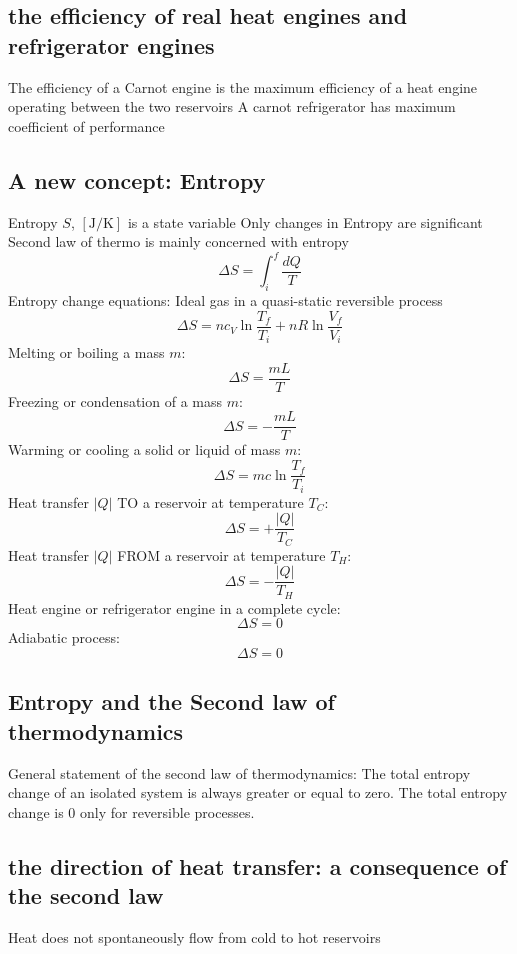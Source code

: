 \documentclass[twocolumn]{article}
\begin{document}
\subsection{the efficiency of real heat engines and refrigerator engines}
\begin{outline}
\1 The efficiency of a Carnot engine is the maximum efficiency of a heat engine operating between the two reservoirs
\1 A carnot refrigerator has maximum coefficient of performance
\end{outline}
\subsection{A new concept: Entropy}
\begin{outline}
\1 Entropy $S$, $[\text{J/K}]$ is a state variable
\1 Only changes in Entropy are significant
\1 Second law of thermo is mainly concerned with entropy
\0 \[\Delta S=\int_{i}^{f}\dfrac{dQ}{T}\]
\1 Entropy change equations: 
\2 Ideal gas in a quasi-static reversible process \[\Delta S=nc_V\ln\dfrac{T_f}{T_i}+nR\ln\dfrac{V_f}{V_i}\]
\2 Melting or boiling a mass $m$: \[\Delta S=\dfrac{mL}{T}\]
\2 Freezing or condensation of a mass $m$: \[\Delta S=-\dfrac{mL}{T}\]
\2 Warming or cooling a solid or liquid of mass $m$: \[\Delta S=mc\ln\dfrac{T_f}{T_i}\]
\2 Heat transfer $|Q|$ TO a reservoir at temperature $T_C$: \[\Delta S=+\dfrac{|Q|}{T_C}\]
\2 Heat transfer $|Q|$ FROM a reservoir at temperature $T_H$: \[\Delta S=-\dfrac{|Q|}{T_H}\]
\2 Heat engine or refrigerator engine in a complete cycle: \[\Delta S=0\]
\2 Adiabatic process: \[\Delta S=0\]
\end{outline}
\subsection{Entropy and the Second law of thermodynamics}
\begin{outline}
\1 General statement of the second law of thermodynamics: The total entropy change of an isolated system is always greater or equal to zero. The total entropy change is 0 only for reversible processes. 
\end{outline}
\subsection{the direction of heat transfer: a consequence of the second law}
\begin{outline}
\1 Heat does not spontaneously flow from cold to hot reservoirs
\end{outline}
\end{document}
